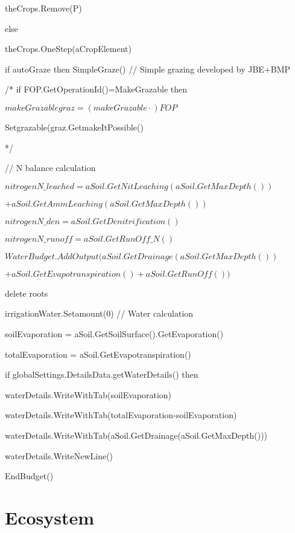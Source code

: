 \documentclass[%
]{scrartcl}
\begin{document}
   \quad	  \quad	  theCrops.Remove(P)
      
     \quad	   else
       
   \quad	  \quad	 theCrops.OneStep(aCropElement)
   

	if autoGraze then SimpleGraze() // Simple grazing developed by JBE+BMP
     


   /*  if FOP.GetOperationId()=MakeGrazable then
   
   	\quad $makeGrazable    graz = (makeGrazable  \cdot ) FOP$

   	\quad Setgrazable(graz.GetmakeItPossible()   

   */

   // N balance calculation

	$nitrogen N\_leached = aSoil.GetNitLeaching(aSoil.GetMaxDepth())$

$+aSoil.GetAmmLeaching(aSoil.GetMaxDepth())$
   
$nitrogen N\_den     = aSoil.GetDenitrification()$
  
 $nitrogen N\_runoff  = aSoil.GetRunOff\_N()$
   
$WaterBudget.AddOutput(aSoil.GetDrainage(aSoil.GetMaxDepth())$

$+aSoil.GetEvapotranspiration()+aSoil.GetRunOff())$

   delete roots
   
irrigationWater.Setamount(0)
   // Water calculation
     
soilEvaporation = aSoil.GetSoilSurface().GetEvaporation()
    
 totalEvaporation = aSoil.GetEvapotranspiration()

   if globalSettings.DetailsData.getWaterDetails() then
  
\quad  	   waterDetails.WriteWithTab(soilEvaporation)

\quad  	   waterDetails.WriteWithTab(totalEvaporation-soilEvaporation)

\quad  	   waterDetails.WriteWithTab(aSoil.GetDrainage(aSoil.GetMaxDepth()))

\quad  	   waterDetails.WriteNewLine()

   EndBudget()







\section{Ecosystem}
\end{document}
